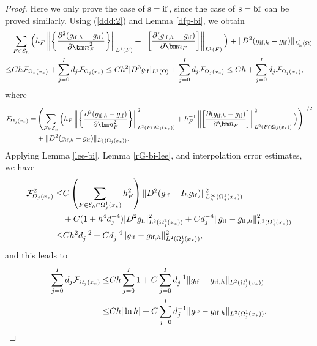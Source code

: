 \documentclass[1996/10/24]{amsart}
\theoremstyle{definition}
\numberwithin{equation}{section}
\begin{document}
\begin{proof}
Here we only prove the case of ${\rm s=if}$, since the case of ${\rm s=bf}$ can be proved similarly. Using (\ref{ddd:2}) and Lemma \ref{dfp-bi}, we obtain
\begin{align}
&\sum_{F\in\mathcal{E}_h}\Big(h_F\left\|\left\{\frac{\partial^2(g_{{\rm if},h}-g_{{\rm if}})}{\partial{\bm n}_F^2}\right\}\right\|_{L^1(F)}+\left\|\left[\frac{\partial(g_{{\rm if},h}-g_{{\rm if}})}{\partial{\bm n}_F}\right]\right\|_{L^1(F)}\Big)
+\|D^2(g_{{\rm if},h}-g_{{\rm if}})\|_{L_h^1(\Omega)}\nonumber\\
\leq& Ch\mathcal{F}_{\Omega_{\ast}(x_{\ast})}+\sum_{j=0}^Id_j\mathcal{F}_{\Omega_j(x_{\ast})}\leq Ch^2|D^3 g_{{\rm if}}|_{L^2(\Omega)}+\sum_{j=0}^Id_j\mathcal{F}_{\Omega_j(x_{\ast})}\leq Ch+\sum_{j=0}^Id_j\mathcal{F}_{\Omega_j(x_{\ast})},\label{rG-bi-L1-proof:1}
\end{align}
where
\begin{align*}
\mathcal{F}_{\Omega_j(x_{\ast})}=&\left(\sum_{F\in\mathcal{E}_h}\Big(h_F\left\|\left\{\frac{\partial^2(g_{{\rm if},h}-g_{{\rm if}})}{\partial{\bm n}_F^2}\right\}\right\|_{L^2(F\cap\Omega_j(x_{\ast}))}^2+h_F^{-1}\left\|\left[\frac{\partial(g_{{\rm if},h}-g_{{\rm if}})}{\partial{\bm n}_F}\right]\right\|_{L^2(F\cap\Omega_j(x_{\ast}))}^2\Big)\right)^{1/2}\\
&+\|D^2(g_{{\rm if},h}-g_{{\rm if}})\|_{L_h^2(\Omega_j(x_{\ast}))}.
\end{align*}
Applying Lemma \ref{lee-bi}, Lemma \ref{rG-bi-lee}, and interpolation error estimates, we have
\begin{align*}
\mathcal{F}_{\Omega_j(x_{\ast})}^2\leq& C\left(\sum_{F\in\mathcal{E}_h\cap\Omega_j^1(x_{\ast})}h_F^2\right)\|D^2(g_{{\rm if}}-I_hg_{{\rm if}})\|_{L_h^{\infty}(\Omega_j^1(x_{\ast}))}^2\\
&+C(1+h^4d_j^{-4})|D^2 g_{{\rm if}}|_{L^2(\Omega_j^2(x_{\ast}))}^2+Cd_j^{-4}\|g_{{\rm if}}-g_{{\rm if},h}\|^2_{L^2(\Omega_j^1(x_{\ast}))}\\
\leq&Ch^2d_j^{-2}+Cd_j^{-4}\|g_{{\rm if}}-g_{{\rm if},h}\|^2_{L^2(\Omega_j^1(x_{\ast}))},
\end{align*}
and this leads to
\begin{align}
\sum_{j=0}^Id_j\mathcal{F}_{\Omega_j(x_{\ast})}\leq& Ch\sum_{j=0}^I 1+C\sum_{j=0}^Id_j^{-1}\|g_{{\rm if}}-g_{{\rm if},h}\|_{L^2(\Omega_j^1(x_{\ast}))}\label{rG-bi-L1-proof:2}\\
\leq& Ch|\ln h|+C\sum_{j=0}^Id_j^{-1}\|g_{{\rm if}}-g_{{\rm if},h}\|_{L^2(\Omega_j^1(x_{\ast}))}.\nonumber
\end{align}


\end{proof}
\end{document}
